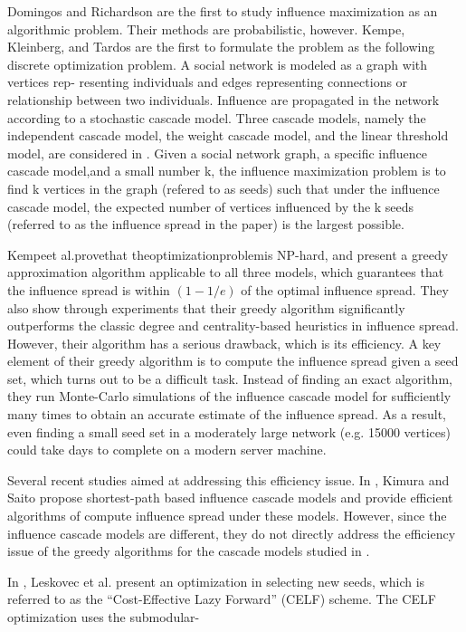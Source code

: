 \documentclass[journal,twoside,web]{ieeecolor}
\begin{document}
Domingos and Richardson \cite{Domingos2001} are the first to study influence maximization as an algorithmic problem. Their methods are probabilistic, however. Kempe, Kleinberg, and Tardos \cite{Kempe2003} are the first to formulate the problem as the following discrete optimization problem. A social network is modeled as a graph with vertices rep-
resenting individuals and edges representing connections or relationship between two individuals. Influence are propagated in the network according to a stochastic cascade model. Three cascade models, namely the independent cascade model, the weight cascade model, and the linear threshold model, are considered in \cite{Kempe2003}. Given a social network graph, a specific influence cascade model,and a small number k, the influence maximization problem is to find k vertices in the graph (refered to as seeds) such that under the influence cascade model, the expected number of vertices influenced by the k seeds (referred to as the influence spread in the paper) is the largest possible.\par
Kempeet al.provethat theoptimizationproblemis NP-hard, and present a greedy approximation algorithm applicable to all three models, which guarantees that the influence spread is within $(1- 1/e)$ of the optimal influence spread. They also show through experiments that their greedy algorithm significantly outperforms the
classic degree and centrality-based heuristics in influence spread. However, their algorithm has a serious drawback, which is its efficiency. A key element of their greedy algorithm is to compute the influence spread given a seed set, which turns out to be a difficult task. Instead of finding an exact algorithm, they run Monte-Carlo
simulations of the influence cascade model for sufficiently many times to obtain an accurate estimate of the influence spread. As a result, even finding a small seed set in a moderately large network (e.g. 15000 vertices) could take days to complete on a modern server machine.\par
Several recent studies aimed at addressing this efficiency issue. In \cite{Kimura2006}, Kimura and Saito propose shortest-path based influence cascade models and provide efficient algorithms of compute influence spread under these models. However, since the influence cascade models are different, they do not directly address the efficiency issue of the greedy algorithms for the cascade models studied in \cite{Kempe2003}. \par
In \cite{Leskovec2007}, Leskovec et al. present an optimization in selecting new seeds, which is referred to as the “Cost-Effective Lazy Forward” (CELF) scheme. The CELF optimization uses the submodular-
\end{document}
